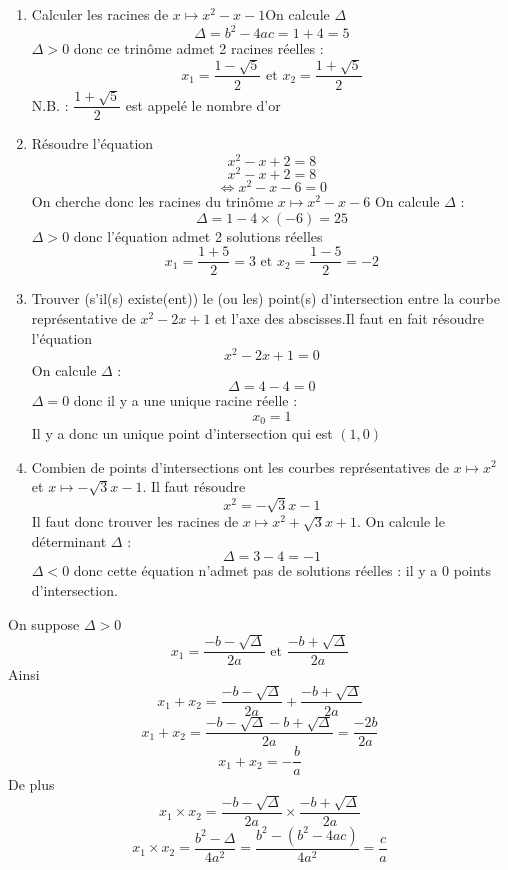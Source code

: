 \begin{exemples}
\begin{enumerate}
\item Calculer les racines de $x\mapsto x^2-x-1$\newline On calcule $\Delta $
$$\Delta = b^2-4ac = 1+4 = 5$$
$\Delta > 0$ donc ce trinôme admet 2 racines réelles : 
$$x_1 = \dfrac{1 - \sqrt{5}}{2} \text{ et } x_2 = \dfrac{1 + \sqrt{5}}{2}$$
N.B. : $\dfrac{1+\sqrt{5}}{2}$ est appelé le nombre d'or
\item Résoudre l'équation 
$$x^2 - x + 2 = 8$$
$$x^2 - x + 2 = 8$$
$$\Leftrightarrow x^2-x-6 = 0$$
On cherche donc les racines du trinôme $x\mapsto x^2 - x - 6$\newline
On calcule $\Delta$ : 
$$\Delta  = 1 - 4\times (-6) = 25$$
$\Delta > 0$ donc l'équation admet 2 solutions réelles 
$$x_1 = \dfrac{1+5}{2} = 3 \text{ et } x_2 =  \dfrac{1-5}{2}=-2$$
\item Trouver (s'il(s) existe(ent)) le (ou les) point(s) d'intersection entre la courbe représentative de $x^2-2x+1$ et l'axe des abscisses.\newline Il faut en fait résoudre l'équation $$x^2-2x+1 = 0$$
On calcule $\Delta$ : 
$$\Delta = 4 - 4 = 0$$
$\Delta = 0$ donc il y a une unique racine réelle : 
$$x_0 = 1$$
Il y a donc un unique point d'intersection qui est $(1,0)$
\item Combien de points d'intersections ont les courbes représentatives de $x \mapsto x^2$ et $x\mapsto -\sqrt{3}x -1$. \newline Il faut résoudre $$x^2 = -\sqrt{3}x - 1$$ Il faut donc trouver les racines de $x\mapsto x^2+ \sqrt{3} x +1$. On calcule le déterminant $\Delta$ : 
$$\Delta = 3 - 4 = -1$$
$\Delta < 0$ donc cette équation n'admet pas de solutions réelles : il y a 0 points d'intersection.
\end{enumerate}
\end{exemples}
\newline
\begin{preuve}
On suppose $\Delta > 0$
$$x_1 = \dfrac{- b -\sqrt{\Delta}}{2a} \text{ et } \dfrac{- b +\sqrt{\Delta}}{2a} $$
Ainsi 
$$x_1+x_2 = \dfrac{- b -\sqrt{\Delta}}{2a}  + \dfrac{- b +\sqrt{\Delta}}{2a} $$
$$x_1+x_2 = \dfrac{-b -\sqrt{\Delta} -b +\sqrt{\Delta}}{2a} = \dfrac{-2b}{2a}$$
$$x_1+x_2 = -\dfrac{b}{a}$$
De plus 
$$x_1\times x_2 = \dfrac{- b -\sqrt{\Delta}}{2a}  \times \dfrac{- b +\sqrt{\Delta}}{2a} $$
$$x_1 \times x_2 = \dfrac{b^2  -\Delta}{4a^2} = \dfrac{b^2 - (b^2-4ac)}{4a^2} = \dfrac{c}{a}$$
\end{preuve}
